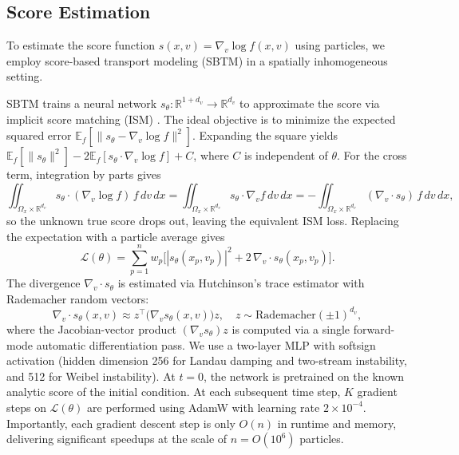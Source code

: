 \documentclass[]{article}
\newcommand{\R}{\mathbb{R}}
\newcommand{\E}{\mathbb{E}}
\numberwithin{equation}{section}
\begin{document}
\subsection{Score Estimation}
\label{sec:score}

To estimate the score function $s(x,v)=\nabla_v \log f(x,v)$ using particles, we employ score-based transport modeling (SBTM) \citep{boffi2023probability, ilin2025transport} in a spatially inhomogeneous setting. 

SBTM trains a neural network $s_\theta \colon \R^{1+d_v} \to \R^{d_v}$ to approximate the score via implicit score matching (ISM) \citep{hyvarinen2005estimation}. The ideal objective is to minimize the expected squared error $\E_f[\|s_\theta - \nabla_v \log f\|^2]$. Expanding the square yields $\E_f[\|s_\theta\|^2] - 2\E_f[s_\theta \cdot \nabla_v \log f] + C$, where $C$ is independent of $\theta$. For the cross term, integration by parts gives
\begin{equation}
\label{eq:ism_ibp}
\iint_{\Omega_x\times\R^{d_v}} s_\theta \cdot (\nabla_v \log f)\, f \, dv \,dx= \iint_{\Omega_x\times\R^{d_v}} s_\theta \cdot \nabla_v f \, dv \, dx= -\iint_{\Omega_x\times\R^{d_v}} (\nabla_v \cdot s_\theta)\, f \, dv\, dx,
\end{equation}
so the unknown true score drops out, leaving the equivalent ISM loss. Replacing the expectation with a particle average gives
\begin{equation}
\label{eq:ism}
\mathcal{L}(\theta) = \sum_{p=1}^{n} w_p \Big[ |s_\theta(x_p, v_p)|^2 + 2\, \nabla_v \cdot s_\theta(x_p, v_p) \Big].
\end{equation}
The divergence $\nabla_v \cdot s_\theta$ is estimated via Hutchinson's trace estimator \citep{hutchinson1989stochastic} with Rademacher random vectors:
\begin{equation}
\label{eq:hutchinson}
\nabla_v \cdot s_\theta(x, v) \approx z^\top \big(\nabla_v s_\theta(x, v)\big) z, \quad z \sim \mathrm{Rademacher}(\pm 1)^{d_v},
\end{equation}
where the Jacobian-vector product $(\nabla_v s_\theta) z$ is computed via a single forward-mode automatic differentiation pass. We use a two-layer MLP with softsign activation (hidden dimension 256 for Landau damping and two-stream instability, and 512 for Weibel instability).  At $t = 0$, the network is pretrained on the known analytic score of the initial condition.  At each subsequent time step, $K$ gradient steps on $\mathcal{L}(\theta)$ are performed using AdamW with learning rate $2 \times 10^{-4}$. Importantly, each gradient descent step is only $O(n)$ in runtime and memory, delivering significant speedups at the scale of $n=O(10^6)$ particles.
\end{document}
